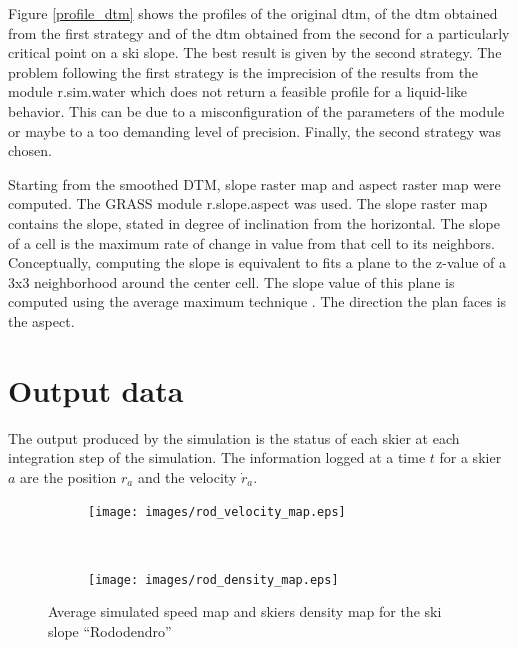 \documentclass[12pt,a4paper,twoside]{book}
\begin{document}
Figure \ref{profile_dtm} shows the profiles of the original dtm, of the dtm obtained from the first strategy and of the dtm obtained from the second for a particularly critical point on a ski slope. The best result is given by the second strategy. The problem following the first strategy is the imprecision of the results from the module r.sim.water which does not return a feasible profile for a liquid-like behavior. This can be due to a misconfiguration of the parameters of the module or maybe to a too demanding level of precision. Finally, the second strategy was chosen.

Starting from the smoothed DTM, slope raster map and aspect raster map were computed. The GRASS module r.slope.aspect was used. The slope raster map contains the slope, stated in degree of inclination from the horizontal. The slope of a cell is the maximum rate of change in value from that cell to its neighbors. Conceptually, computing the slope is equivalent to fits a plane to the z-value of a 3x3 neighborhood around the center cell. The slope value of this plane is computed using the average maximum technique \cite{bur2009}. The direction the plan faces is the aspect.

\section{Output data}\label{output_data}
The output produced by the simulation is the status of each skier at each integration step of the simulation. The information logged at a time $t$ for a skier $a$ are the position $r_a$ and the velocity $\dot{r}_a$.

\begin{figure}[!h]
        \centering
        \begin{subfigure}[b]{0.5\textwidth}
                \centering
                \texttt{[image: images/rod\_velocity\_map.eps]}
                \caption{}\label{rododendro_vel}
        \end{subfigure}%
        ~ %
        \begin{subfigure}[b]{0.5\textwidth}
                \centering
                \texttt{[image: images/rod\_density\_map.eps]}
                \caption{}\label{rododendro_den}
        \end{subfigure}
        \caption{Average simulated speed map and skiers density map for the ski slope ``Rododendro''}\label{rododendro}
\end{figure}
\end{document}

